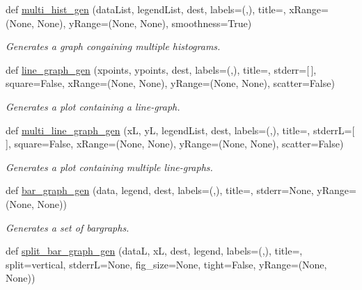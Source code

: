 \begin{DoxyCompactItemize}
def \mbox{\hyperlink{namespacedynamicfilterapp_1_1simulation__files_1_1plot_script_a9b2bc9bb00f25db0e45c39b7c096dcf3}{multi\+\_\+hist\+\_\+gen}} (data\+List, legend\+List, dest, labels=(\textquotesingle{}\textquotesingle{},\textquotesingle{}\textquotesingle{}), title=\textquotesingle{}\textquotesingle{}, x\+Range=(None, None), y\+Range=(None, None), smoothness=True)
\begin{DoxyCompactList}\small\item\em Generates a graph congaining multiple histograms. \end{DoxyCompactList}\item 
def \mbox{\hyperlink{namespacedynamicfilterapp_1_1simulation__files_1_1plot_script_a2f9f1a1478f6aecc43e6e6dd0426906f}{line\+\_\+graph\+\_\+gen}} (xpoints, ypoints, dest, labels=(\textquotesingle{}\textquotesingle{},\textquotesingle{}\textquotesingle{}), title=\textquotesingle{}\textquotesingle{}, stderr=\mbox{[}$\,$\mbox{]}, square=False, x\+Range=(None, None), y\+Range=(None, None), scatter=False)
\begin{DoxyCompactList}\small\item\em Generates a plot containing a line-\/graph. \end{DoxyCompactList}\item 
def \mbox{\hyperlink{namespacedynamicfilterapp_1_1simulation__files_1_1plot_script_a647bf0080f13c14da1851fa89e12596b}{multi\+\_\+line\+\_\+graph\+\_\+gen}} (xL, yL, legend\+List, dest, labels=(\textquotesingle{}\textquotesingle{},\textquotesingle{}\textquotesingle{}), title=\textquotesingle{}\textquotesingle{}, stderrL=\mbox{[}$\,$\mbox{]}, square=False, x\+Range=(None, None), y\+Range=(None, None), scatter=False)
\begin{DoxyCompactList}\small\item\em Generates a plot containing multiple line-\/graphs. \end{DoxyCompactList}\item 
def \mbox{\hyperlink{namespacedynamicfilterapp_1_1simulation__files_1_1plot_script_a9da59b1b257e292c4a53c89baf4862ea}{bar\+\_\+graph\+\_\+gen}} (data, legend, dest, labels=(\textquotesingle{}\textquotesingle{},\textquotesingle{}\textquotesingle{}), title=\textquotesingle{}\textquotesingle{}, stderr=None, y\+Range=(None, None))
\begin{DoxyCompactList}\small\item\em Generates a set of bargraphs. \end{DoxyCompactList}\item 
def \mbox{\hyperlink{namespacedynamicfilterapp_1_1simulation__files_1_1plot_script_a8ffea8a8a4ebae3175cfb4d73d7be756}{split\+\_\+bar\+\_\+graph\+\_\+gen}} (dataL, xL, dest, legend, labels=(\textquotesingle{}\textquotesingle{},\textquotesingle{}\textquotesingle{}), title=\textquotesingle{}\textquotesingle{}, split=\textquotesingle{}vertical\textquotesingle{}, stderrL=None, fig\+\_\+size=None, tight=False, y\+Range=(None, None))

\end{DoxyCompactItemize}
